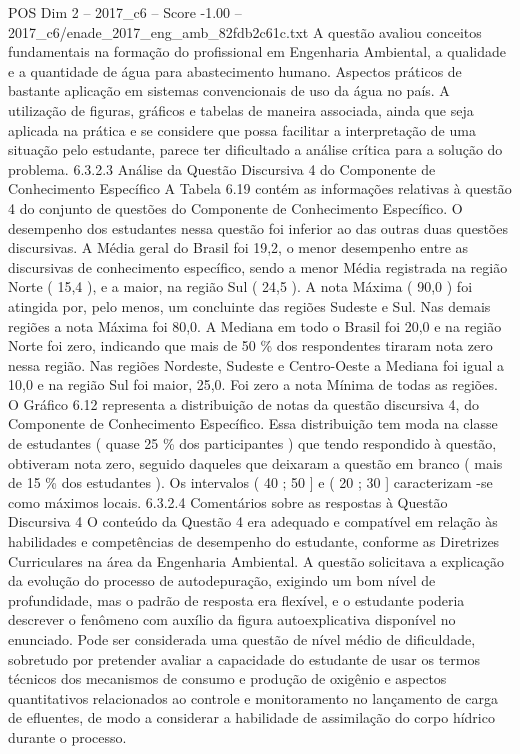 \begin{textsample}{POS Dim 2 – 2017\_c6 – Score -1.00 – 2017\_c6/enade\_2017\_eng\_amb\_82fdb2c61c.txt}
A questão avaliou conceitos fundamentais na formação do profissional em Engenharia Ambiental, a qualidade e a quantidade de água para abastecimento humano.
Aspectos práticos de bastante aplicação em sistemas convencionais de uso da água no país.
A utilização de figuras, gráficos e tabelas de maneira associada, ainda que seja aplicada na prática e se considere que possa facilitar a interpretação de uma situação pelo estudante, parece ter dificultado a análise crítica para a solução do problema. 6.3.2.3 Análise da Questão Discursiva 4 do Componente de Conhecimento Específico A Tabela 6.19 contém as informações relativas à questão 4 do conjunto de questões do Componente de Conhecimento Específico.
O desempenho dos estudantes nessa questão foi inferior ao das outras duas questões discursivas.
A Média geral do Brasil foi 19,2, o menor desempenho entre as discursivas de conhecimento específico, sendo a menor Média registrada na região Norte ( 15,4 ), e a maior, na região Sul ( 24,5 ).
A nota Máxima ( 90,0 ) foi atingida por, pelo menos, um concluinte das regiões Sudeste e Sul.
Nas demais regiões a nota Máxima foi 80,0.
A Mediana em todo o Brasil foi 20,0 e na região Norte foi zero, indicando que mais de 50 \% dos respondentes tiraram nota zero nessa região.
Nas regiões Nordeste, Sudeste e Centro-Oeste a Mediana foi igual a 10,0 e na região Sul foi maior, 25,0.
Foi zero a nota Mínima de todas as regiões.
O Gráfico 6.12 representa a distribuição de notas da questão discursiva 4, do Componente de Conhecimento Específico.
Essa distribuição tem moda na classe de estudantes ( quase 25 \% dos participantes ) que tendo respondido à questão, obtiveram nota zero, seguido daqueles que deixaram a questão em branco ( mais de 15 \% dos estudantes ).
Os intervalos ( 40 ; 50 ] e ( 20 ; 30 ] caracterizam -se como máximos locais. 6.3.2.4 Comentários sobre as respostas à Questão Discursiva 4 O conteúdo da Questão 4 era adequado e compatível em relação às habilidades e competências de desempenho do estudante, conforme as Diretrizes Curriculares na área da Engenharia Ambiental.
A questão solicitava a explicação da evolução do processo de autodepuração, exigindo um bom nível de profundidade, mas o padrão de resposta era flexível, e o estudante poderia descrever o fenômeno com auxílio da figura autoexplicativa disponível no enunciado.
Pode ser considerada uma questão de nível médio de dificuldade, sobretudo por pretender avaliar a capacidade do estudante de usar os termos técnicos dos mecanismos de consumo e produção de oxigênio e aspectos quantitativos relacionados ao controle e monitoramento no lançamento de carga de efluentes, de modo a considerar a habilidade de assimilação do corpo hídrico durante o processo.

\end{textsample}
